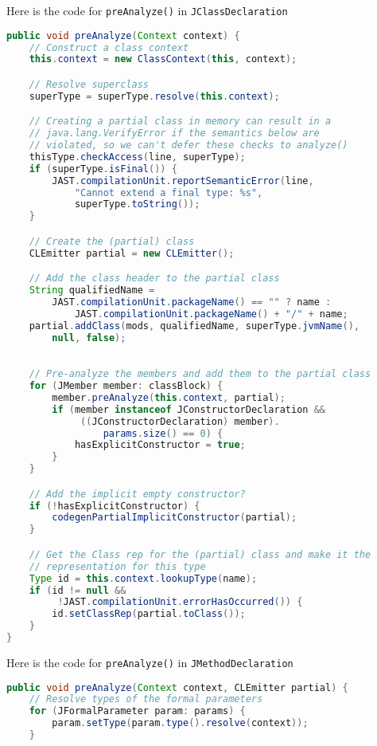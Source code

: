 \documentclass[8pt,a4paper,compress]{beamer}
\begin{document}
\begin{frame}[fragile]
\pause

Here is the code for \lstinline{preAnalyze()} in \lstinline{JClassDeclaration}
\begin{lstlisting}[language=Java]
public void preAnalyze(Context context) {
    // Construct a class context
    this.context = new ClassContext(this, context);

    // Resolve superclass
    superType = superType.resolve(this.context);

    // Creating a partial class in memory can result in a
    // java.lang.VerifyError if the semantics below are
    // violated, so we can't defer these checks to analyze()
    thisType.checkAccess(line, superType);
    if (superType.isFinal()) {
        JAST.compilationUnit.reportSemanticError(line,
            "Cannot extend a final type: %s",                                   
            superType.toString());
    }

    // Create the (partial) class
    CLEmitter partial = new CLEmitter();

    // Add the class header to the partial class
    String qualifiedName =
        JAST.compilationUnit.packageName() == "" ? name :
            JAST.compilationUnit.packageName() + "/" + name;
    partial.addClass(mods, qualifiedName, superType.jvmName(),
        null, false);
\end{lstlisting}
\end{frame}

\begin{frame}[fragile]
\pause

\begin{lstlisting}[language=Java]

    // Pre-analyze the members and add them to the partial class
    for (JMember member: classBlock) {
        member.preAnalyze(this.context, partial);
        if (member instanceof JConstructorDeclaration &&
             ((JConstructorDeclaration) member).
                 params.size() == 0) {
            hasExplicitConstructor = true;
        }
    }

    // Add the implicit empty constructor?
    if (!hasExplicitConstructor) {
        codegenPartialImplicitConstructor(partial);
    }

    // Get the Class rep for the (partial) class and make it the
    // representation for this type
    Type id = this.context.lookupType(name);
    if (id != null &&
         !JAST.compilationUnit.errorHasOccurred()) {
        id.setClassRep(partial.toClass());
    }
}
\end{lstlisting}

\pause
\bigskip

Here is the code for \lstinline{preAnalyze()} in \lstinline{JMethodDeclaration}
\begin{lstlisting}[language=Java]
public void preAnalyze(Context context, CLEmitter partial) {
    // Resolve types of the formal parameters
    for (JFormalParameter param: params) {
        param.setType(param.type().resolve(context));
    }
\end{lstlisting}
\end{frame}
\end{document}
